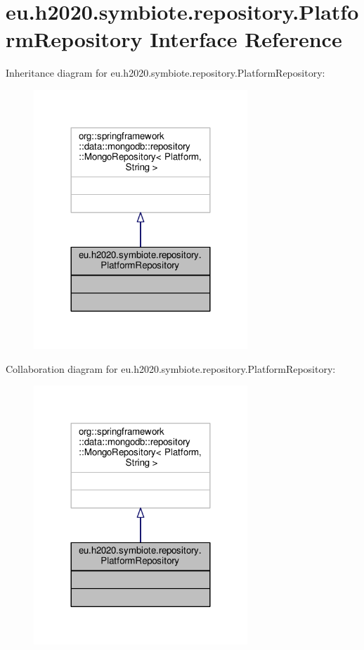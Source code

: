 \hypertarget{interfaceeu_1_1h2020_1_1symbiote_1_1repository_1_1PlatformRepository}{}\section{eu.\+h2020.\+symbiote.\+repository.\+Platform\+Repository Interface Reference}
\label{interfaceeu_1_1h2020_1_1symbiote_1_1repository_1_1PlatformRepository}


Inheritance diagram for eu.\+h2020.\+symbiote.\+repository.\+Platform\+Repository\+:
\nopagebreak
\begin{figure}[H]
\begin{center}
\leavevmode
\includegraphics[width=228pt]{interfaceeu_1_1h2020_1_1symbiote_1_1repository_1_1PlatformRepository__inherit__graph}
\end{center}
\end{figure}


Collaboration diagram for eu.\+h2020.\+symbiote.\+repository.\+Platform\+Repository\+:
\nopagebreak
\begin{figure}[H]
\begin{center}
\leavevmode
\includegraphics[width=228pt]{interfaceeu_1_1h2020_1_1symbiote_1_1repository_1_1PlatformRepository__coll__graph}
\end{center}
\end{figure}


